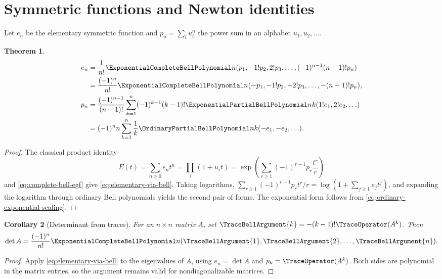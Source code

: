 \documentclass[11pt,a4paper,oneside,openany]{book}
\newtheorem{theorem}{Theorem}[chapter]
\newtheorem{corollary}[theorem]{Corollary}
\theoremstyle{definition}
\theoremstyle{remark}
\begin{document}
\section{Symmetric functions and Newton identities}
Let $e_n$ be the elementary symmetric function and
$p_n=\sum_i u_i^n$ the power sum in an alphabet $u_1,u_2,\ldots$.
\begin{theorem}\label{thm:bell-symmetric-functions}
\begin{align}
 e_n&=\frac1{n!}\ExponentialCompleteBellPolynomial n(p_1,-1!p_2,2!p_3,\ldots,(-1)^{n-1}(n-1)!p_n)
 \label{eq:elementary-via-bell}\\
 &=\frac{(-1)^n}{n!}\ExponentialCompleteBellPolynomial n(-p_1,-1!p_2,-2!p_3,\ldots,-(n-1)!p_n),
 \notag\\
 p_n&=\frac{(-1)^{n-1}}{(n-1)!}
 \sum_{k=1}^{n}(-1)^{k-1}(k-1)!
 \ExponentialPartialBellPolynomial nk(1!e_1,2!e_2,\ldots)
 \label{eq:powersum-via-bell}\\
 &=(-1)^n n\sum_{k=1}^{n}\frac1k
 \OrdinaryPartialBellPolynomial nk(-e_1,-e_2,\ldots).
 \notag
\end{align}
\end{theorem}
\begin{proof}
The classical product identity
\[
 E(t)=\sum_{n\ge0}e_nt^n=\prod_i(1+u_it)
 =\exp\!\left(\sum_{r\ge1}(-1)^{r-1}p_r\frac{t^r}{r}\right)
\]
and \eqref{eq:complete-bell-egf} give \eqref{eq:elementary-via-bell}.
Taking logarithms,
$\sum_{r\ge1}(-1)^{r-1}p_rt^r/r=\log(1+\sum_{j\ge1}e_jt^j)$, and expanding
the logarithm through ordinary Bell polynomials yields the second pair of forms.
The exponential form follows from \eqref{eq:ordinary-exponential-scaling}.
\end{proof}

\begin{corollary}[Determinant from traces]\label{cor:det-traces-bell}
For an $n\times n$ matrix $A$, set
$\TraceBellArgument{k}=-(k-1)!\TraceOperator(A^k)$.  Then
\begin{equation}\label{eq:det-traces-bell}
 \det A=\frac{(-1)^n}{n!}\ExponentialCompleteBellPolynomial n(\TraceBellArgument{1},\TraceBellArgument{2},\ldots,\TraceBellArgument{n}).
\end{equation}
\end{corollary}
\begin{proof}
Apply \eqref{eq:elementary-via-bell} to the eigenvalues of $A$, using
$e_n=\det A$ and $p_k=\TraceOperator(A^k)$.  Both sides are polynomial in the matrix entries,
so the argument remains valid for nondiagonalizable matrices.
\end{proof}
\end{document}
